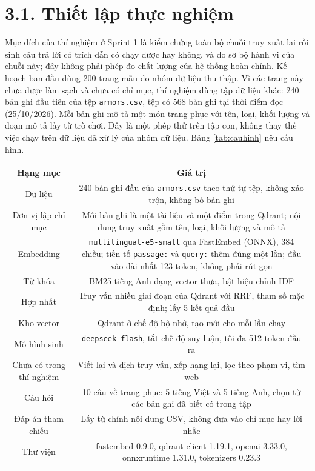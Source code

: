 
\section{3.1. Thiết lập thực nghiệm}

Mục đích của thí nghiệm ở Sprint 1 là kiểm chứng toàn bộ chuỗi truy xuất lai rồi sinh câu trả lời có trích dẫn có chạy được hay không, và đo sơ bộ hành vi của chuỗi này; đây không phải phép đo chất lượng của hệ thống hoàn chỉnh. Kế hoạch ban đầu dùng 200 trang mẫu do nhóm dữ liệu thu thập. Vì các trang này chưa được làm sạch và chưa có chỉ mục, thí nghiệm dùng tập dữ liệu khác: 240 bản ghi đầu tiên của tệp \texttt{armors.csv}, tệp có 568 bản ghi tại thời điểm đọc (25/10/2026). Mỗi bản ghi mô tả một món trang phục với tên, loại, khối lượng và đoạn mô tả lấy từ trò chơi. Đây là một phép thử trên tập con, không thay thế việc chạy trên dữ liệu đã xử lý của nhóm dữ liệu. Bảng \ref{tab:cauhinh} nêu cấu hình.


\begin{longtable*}{|C{0.30}|C{0.70}|}
\hline \textbf{Hạng mục} & \textbf{Giá trị} \\ \hline
Dữ liệu & 240 bản ghi đầu của \texttt{armors.csv} theo thứ tự tệp, không xáo trộn, không bỏ bản ghi \\ \hline
Đơn vị lập chỉ mục & Mỗi bản ghi là một tài liệu và một điểm trong Qdrant; nội dung truy xuất gồm tên, loại, khối lượng và mô tả \\ \hline
Embedding & \texttt{multilingual-e5-small} qua FastEmbed (ONNX), 384 chiều; tiền tố \texttt{passage:} và \texttt{query:} thêm đúng một lần; đầu vào dài nhất 123 token, không phải rút gọn \\ \hline
Từ khóa & BM25 tiếng Anh dạng vector thưa, bật hiệu chỉnh IDF \\ \hline
Hợp nhất & Truy vấn nhiều giai đoạn của Qdrant với RRF, tham số mặc định; lấy 5 kết quả đầu \\ \hline
Kho vector & Qdrant ở chế độ bộ nhớ, tạo mới cho mỗi lần chạy \\ \hline
Mô hình sinh & \texttt{deepseek-flash}, tắt chế độ suy luận, tối đa 512 token đầu ra \\ \hline
Chưa có trong thí nghiệm & Viết lại và dịch truy vấn, xếp hạng lại, lọc theo phạm vi, tìm web \\ \hline
Câu hỏi & 10 câu về trang phục: 5 tiếng Việt và 5 tiếng Anh, chọn từ các bản ghi đã biết có trong tập \\ \hline
Đáp án tham chiếu & Lấy từ chính nội dung CSV, không đưa vào chỉ mục hay lời nhắc \\ \hline
Thư viện & fastembed 0.9.0, qdrant-client 1.19.1, openai 3.33.0, onnxruntime 1.31.0, tokenizers 0.23.3 \\ \hline
\end{longtable*}
\tabend


